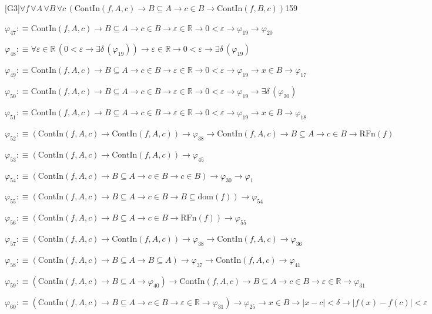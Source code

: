 \begin{fullproof}{[G3]}{$\forall f\,\forall A\,\forall B\,\forall c\,(\mathrm{ContIn}(f,A,c) \to B \subseteq A \to c \in B \to \mathrm{ContIn}(f,B,c))$}{159}
\begin{abbrevlist}
\item $\varphi_{47} :\equiv \mathrm{ContIn}(f,A,c) \to B \subseteq A \to c \in B \to \varepsilon \in \mathbb{R} \to 0 < \varepsilon \to \varphi_{19} \to \varphi_{20}$
\item $\varphi_{48} :\equiv \forall \varepsilon \in \mathbb{R}\,(0 < \varepsilon \to \exists \delta\,(\varphi_{19})) \to \varepsilon \in \mathbb{R} \to 0 < \varepsilon \to \exists \delta\,(\varphi_{19})$
\item $\varphi_{49} :\equiv \mathrm{ContIn}(f,A,c) \to B \subseteq A \to c \in B \to \varepsilon \in \mathbb{R} \to 0 < \varepsilon \to \varphi_{19} \to x \in B \to \varphi_{17}$
\item $\varphi_{50} :\equiv \mathrm{ContIn}(f,A,c) \to B \subseteq A \to c \in B \to \varepsilon \in \mathbb{R} \to 0 < \varepsilon \to \varphi_{19} \to \exists \delta\,(\varphi_{20})$
\item $\varphi_{51} :\equiv \mathrm{ContIn}(f,A,c) \to B \subseteq A \to c \in B \to \varepsilon \in \mathbb{R} \to 0 < \varepsilon \to \varphi_{19} \to x \in B \to \varphi_{18}$
\item $\varphi_{52} :\equiv (\mathrm{ContIn}(f,A,c) \to \mathrm{ContIn}(f,A,c)) \to \varphi_{38} \to \mathrm{ContIn}(f,A,c) \to B \subseteq A \to c \in B \to \mathrm{RFn}(f)$
\item $\varphi_{53} :\equiv (\mathrm{ContIn}(f,A,c) \to \mathrm{ContIn}(f,A,c)) \to \varphi_{45}$
\item $\varphi_{54} :\equiv (\mathrm{ContIn}(f,A,c) \to B \subseteq A \to c \in B \to c \in B) \to \varphi_{30} \to \varphi_{1}$
\item $\varphi_{55} :\equiv (\mathrm{ContIn}(f,A,c) \to B \subseteq A \to c \in B \to B \subseteq \mathrm{dom}(f)) \to \varphi_{54}$
\item $\varphi_{56} :\equiv (\mathrm{ContIn}(f,A,c) \to B \subseteq A \to c \in B \to \mathrm{RFn}(f)) \to \varphi_{55}$
\item $\varphi_{57} :\equiv (\mathrm{ContIn}(f,A,c) \to \mathrm{ContIn}(f,A,c)) \to \varphi_{38} \to \mathrm{ContIn}(f,A,c) \to \varphi_{36}$
\item $\varphi_{58} :\equiv (\mathrm{ContIn}(f,A,c) \to B \subseteq A \to B \subseteq A) \to \varphi_{37} \to \mathrm{ContIn}(f,A,c) \to \varphi_{41}$
\item $\varphi_{59} :\equiv (\mathrm{ContIn}(f,A,c) \to B \subseteq A \to \varphi_{40}) \to \mathrm{ContIn}(f,A,c) \to B \subseteq A \to c \in B \to \varepsilon \in \mathbb{R} \to \varphi_{31}$
\item $\varphi_{60} :\equiv (\mathrm{ContIn}(f,A,c) \to B \subseteq A \to c \in B \to \varepsilon \in \mathbb{R} \to \varphi_{31}) \to \varphi_{25} \to x \in B \to \lvert x - c \rvert < \delta \to \lvert f(x) - f(c) \rvert < \varepsilon$

\end{abbrevlist}
\end{fullproof}
